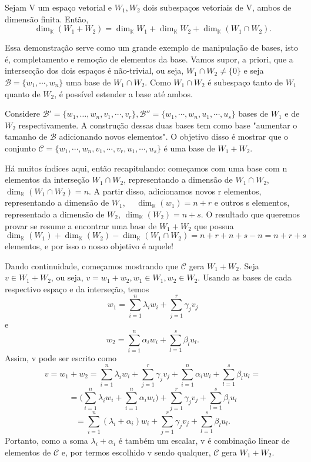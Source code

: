 \begin{proposition*}
    Sejam V um espa\c co vetorial e $W_1, W_2$ dois subespa\c cos vetoriais de V, ambos de dimens\~ao finita. Ent\~ao,
$$
    \dim_{\mathbb{K}} (W_1 + W_2) = \dim_{\mathbb{K}} W_1 + \dim_{\mathbb{K}} W_2 + \dim_{\mathbb{K}}(W_1\cap W_2).
$$
\end{proposition*}
\begin{proof*}
    Essa demonstra\c c\~ao serve como um grande exemplo de manipula\c c\~ao de bases, isto \'e, completamento e remo\c c\~ao
de elementos da base. Vamos supor, a priori, que a intersec\c c\~ao dos dois espa\c cos \'e n\~ao-trivial, ou seja, 
$W_1\cap{W_2} \neq \{0\}$ e seja $\mathcal{B} = \{w_1, \cdots, w_n\}$ uma base de $W_1\cap{W_2}$. Como $W_1\cap{W_2}$
\'e subespa\c co tanto de $W_1$ quanto de $W_2$, \'e poss\'ivel estender a base at\'e ambos.

Considere $\mathcal{B'} = \{w_1, \dots, w_n, v_1, \cdots, v_r\}, \mathcal{B''} = \{w_1, \cdots, w_n, u_1, \cdots, u_s\}$ 
bases de $W_1$ e de $W_2$ respectivamente. A constru\c c\~ao dessas duas bases tem como base "aumentar o tamanho de 
$\mathcal{B}$ adicionando novos elementos". O objetivo disso \'e mostrar que o conjunto $\mathcal{C} = \{w_1, \cdots, 
w_n, v_1, \cdots, v_r, u_1, \cdots, u_s\}$ \'e uma base de $W_1 + W_2.$

H\'a muitos \'indices aqui, ent\~ao recapitulando: come\c camos com uma base com n elementos da interse\c c\~ao $W_1\cap{W_2}$,
representando a dimens\~ao de $W_1\cap{W_2}$, $\dim_{\mathbb{K}}(W_1\cap{W_2}) = n.$ A partir disso, adicionamos novos r
elementos, representando a dimens\~ao de $W_1$, $\quad\dim_{\mathbb{K}}(w_1) = n + r$ e outros s elementos, representado
a dimens\~ao de $W_2$, $\dim_{\mathbb{K}}(W_2) = n + s.$ O resultado que queremos provar se resume a encontrar uma base de
$W_1 + W_2$ que possua 
$$
    \dim_{\mathbb{K}}(W_1) + \dim_{\mathbb{K}}(W_2) - \dim_{\mathbb{K}}(W_1\cap{W_2}) = n + r + n + s - n = n + r + s
$$
elementos, e por isso o nosso objetivo \'e aquele!

Dando continuidade, come\c camos mostrando que $\mathcal{C}$ gera $W_1 + W_2$. Seja $v\in{W_1+W_2}$, ou seja, 
$v = w_1 + w_2, w_1\in{W_1}, w_2\in{W_2}$. Usando as bases de cada respectivo espa\c co e da interse\c c\~ao, temos 
$$
    w_1 = \sum_{i=1}^{n}\lambda_{i}w_{i} + \sum_{j=1}^{r}\gamma_{j}v_{j} 
$$
e
$$
    w_2 = \sum_{i=1}^{n}\alpha_{i}w_{i} + \sum_{l=1}^{s}\beta_{l}u_{l}.
$$
Assim, v pode ser escrito como 
$$
    v = w_1 + w_2 = \sum_{i=1}^{n}\lambda_{i}w_{i} + \sum_{j=1}^{r}\gamma_{j}v_{j} + 
    \sum_{i=1}^{n}\alpha_{i}w_{i} + \sum_{l=1}^{s}\beta_{l}u_{l} =
$$
$$
    = \biggl(\sum_{i=1}^{n}\lambda_{i}w_{i} + \sum_{i=1}^{n}\alpha_{i}w_{i}\biggr) + \sum_{j=1}^{r}\gamma_{j}v_{j} + \sum_{l=1}^{s}\beta_{l}u_{l} 
$$
$$
    = \sum_{i=1}^{n}(\lambda_{i} + \alpha_{i})w_{i} + \sum_{j=1}^{r}\gamma_{j}v_{j} + \sum_{l=1}^{s}\beta_{l}u_{l}.
$$
Portanto, como a soma $\lambda_{i} + \alpha_{i}$ \'e tamb\'em um escalar, v \'e combina\c c\~ao linear de elementos de $\mathcal{C}$ e,
por termos escolhido v sendo qualquer, $\mathcal{C}$ gera $W_1 + W_2.$ 


\end{proof*}
